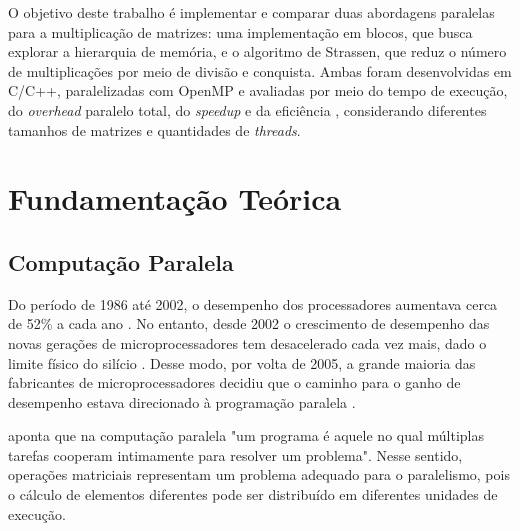 \documentclass[12pt]{article}
\begin{document}
O objetivo deste trabalho é implementar e comparar duas abordagens paralelas para a multiplicação de matrizes: uma implementação em blocos, que busca explorar a hierarquia de memória, e o algoritmo de Strassen, que reduz o número de multiplicações por meio de divisão e conquista. Ambas foram desenvolvidas em C/C++, paralelizadas com OpenMP e avaliadas por meio do tempo de execução, do \textit{overhead} paralelo total, do \textit{speedup} e da eficiência \cite{grama2003}, considerando diferentes tamanhos de matrizes e quantidades de \textit{threads}.


\section{Fundamentação Teórica} \label{sec:firstpage}
\subsection{Computação Paralela}
Do período de 1986 até 2002, o desempenho dos processadores aumentava cerca de 52\% a cada ano \cite{herlihy2008}. No entanto, desde 2002 o crescimento de desempenho das novas gerações de microprocessadores tem desacelerado cada vez mais, dado o limite físico do silício \cite{hennessy2017}. Desse modo, por volta de 2005, a grande maioria das fabricantes de microprocessadores decidiu que o caminho para o ganho de desempenho estava direcionado à programação paralela \cite{pacheco2011}.
\par
\cite{pacheco2011} aponta que na computação paralela "um programa é aquele no qual múltiplas tarefas cooperam intimamente para resolver um problema". Nesse sentido, operações matriciais representam um problema adequado para o paralelismo, pois o cálculo de elementos diferentes pode ser distribuído em diferentes unidades de execução.
\end{document}
